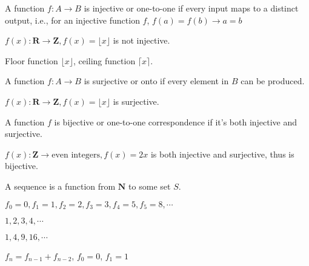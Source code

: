 \begin{defn}
A function $f: A \rightarrow B$ is injective or one-to-one if every input maps to a distinct output, i.e., for an injective function $f$, $f(a) = f(b) \rightarrow a = b$
\end{defn}

\begin{ex}
$f(x): \mathbf{R} \rightarrow \mathbf{Z}, f(x) = \lfloor x \rfloor$ is not injective.
\end{ex}

\begin{remark}
Floor function $\lfloor x \rfloor$, ceiling function $\lceil x \rceil$.
\end{remark}

\begin{defn}
A function $f: A \rightarrow B$ is surjective or onto if every element in $B$ can be produced.
\end{defn}

\begin{ex}
$f(x): \mathbf{R} \rightarrow \mathbf{Z}, f(x) = \lfloor x \rfloor$ is surjective.
\end{ex}

\begin{defn}
A function $f$ is bijective or one-to-one correspondence if it's both injective and surjective.
\end{defn}

\begin{ex}
$f(x): \mathbf{Z} \rightarrow \text{even integers}, f(x) = 2x$ is both injective and surjective, thus is bijective.
\end{ex}

\begin{defn}
A sequence is a function from $\mathbf{N}$ to some set $S$.
\end{defn}

\begin{ex}
$f_0 = 0, f_1 = 1, f_2 = 2, f_3 = 3, f_4 = 5, f_5 = 8, \cdots$
\end{ex}

\begin{ex}
$1, 2, 3, 4, \cdots$
\end{ex}

\begin{ex}
$1, 4, 9, 16, \cdots$
\end{ex}

\begin{ex}
$f_n = f_{n - 1} + f_{n - 2}$, $f_0 = 0$, $f_1 = 1$
\end{ex}

